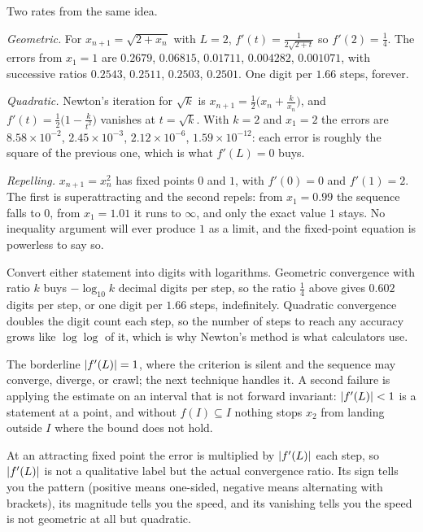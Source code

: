 \begin{worked}
Two rates from the same idea.

\emph{Geometric.} For $x_{n+1}=\sqrt{2+x_n}$ with $L=2$, $f'(t)=\tfrac{1}{2\sqrt{2+t}}$ so $f'(2)=\tfrac14$. The errors from $x_1=1$ are $0.2679$, $0.06815$, $0.01711$, $0.004282$, $0.001071$, with successive ratios $0.2543$, $0.2511$, $0.2503$, $0.2501$. One digit per $1.66$ steps, forever.

\emph{Quadratic.} Newton's iteration for $\sqrt k$ is $x_{n+1}=\tfrac12\bigl(x_n+\tfrac{k}{x_n}\bigr)$, and $f'(t)=\tfrac12\bigl(1-\tfrac{k}{t^2}\bigr)$ vanishes at $t=\sqrt k$. With $k=2$ and $x_1=2$ the errors are $8.58\times10^{-2}$, $2.45\times10^{-3}$, $2.12\times10^{-6}$, $1.59\times10^{-12}$: each error is roughly the square of the previous one, which is what $f'(L)=0$ buys.

\emph{Repelling.} $x_{n+1}=x_n^2$ has fixed points $0$ and $1$, with $f'(0)=0$ and $f'(1)=2$. The first is superattracting and the second repels: from $x_1=0.99$ the sequence falls to $0$, from $x_1=1.01$ it runs to $\infty$, and only the exact value $1$ stays. No inequality argument will ever produce $1$ as a limit, and the fixed-point equation is powerless to say so.

Convert either statement into digits with logarithms. Geometric convergence with ratio $k$ buys $-\log_{10}k$ decimal digits per step, so the ratio $\tfrac14$ above gives $0.602$ digits per step, or one digit per $1.66$ steps, indefinitely. Quadratic convergence doubles the digit count each step, so the number of steps to reach any accuracy grows like $\log\log$ of it, which is why Newton's method is what calculators use.
\end{worked}

\begin{trap}
The borderline $\left\lvert f'(L)\right\rvert=1$, where the criterion is silent and the sequence may converge, diverge, or crawl; the next technique handles it. A second failure is applying the estimate on an interval that is not forward invariant: $\left\lvert f'(L)\right\rvert<1$ is a statement at a point, and without $f(I)\subseteq I$ nothing stops $x_2$ from landing outside $I$ where the bound does not hold.
\end{trap}

\begin{keynote}
At an attracting fixed point the error is multiplied by $\left\lvert f'(L)\right\rvert$ each step, so $\left\lvert f'(L)\right\rvert$ is not a qualitative label but the actual convergence ratio. Its sign tells you the pattern (positive means one-sided, negative means alternating with brackets), its magnitude tells you the speed, and its vanishing tells you the speed is not geometric at all but quadratic.
\end{keynote}

